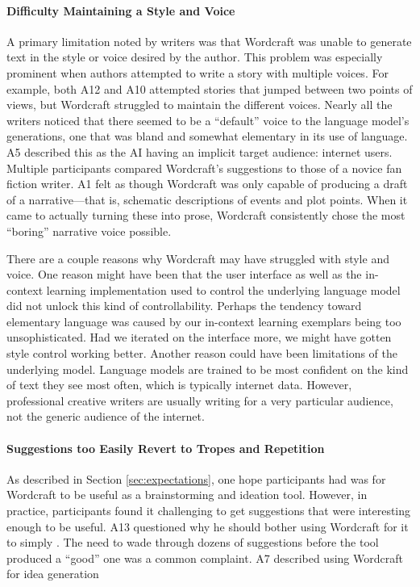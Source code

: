 \paragraph{Difficulty Maintaining a Style and Voice}
A primary limitation noted by writers was that Wordcraft was unable to generate text in the style or voice desired by the author.
This problem was especially prominent when authors attempted to write a story with multiple voices.
For example, both A12 and A10 attempted stories that jumped between two points of views, but Wordcraft struggled to maintain the different voices.
Nearly all the writers noticed that there seemed to be a ``default'' voice to the language model's generations, one that was bland and somewhat elementary in its use of language.
A5 described this as the AI having an implicit target audience: internet users.
Multiple participants compared Wordcraft's suggestions to those of a novice fan fiction writer. 
A1 felt as though Wordcraft was only capable of producing a draft of a narrative---that is, schematic descriptions of events and plot points. When it came to actually turning these into prose, Wordcraft consistently chose the most ``boring'' narrative voice possible.

There are a couple reasons why Wordcraft may have struggled with style and voice.
One reason might have been that the user interface as well as the in-context learning implementation used to control the underlying language model did not unlock this kind of controllability.
Perhaps the tendency toward elementary language was caused by our in-context learning exemplars being too unsophisticated.
Had we iterated on the interface more, we might have gotten style control working better.
Another reason could have been limitations of the underlying model.
Language models are trained to be most confident on the kind of text they see most often, which is typically internet data.
However, professional creative writers are usually writing for a very particular audience, not the generic audience of the internet.

\paragraph{Suggestions too Easily Revert to Tropes and Repetition}
As described in Section \ref{sec:expectations}, one hope participants had was for Wordcraft to be useful as a brainstorming and ideation tool.
However, in practice, participants found it challenging to get suggestions that were interesting enough to be useful.
A13 questioned why he should bother using Wordcraft for it to simply .
The need to wade through dozens of suggestions before the tool produced a ``good'' one was a common complaint.
A7 described using Wordcraft for idea generation 

